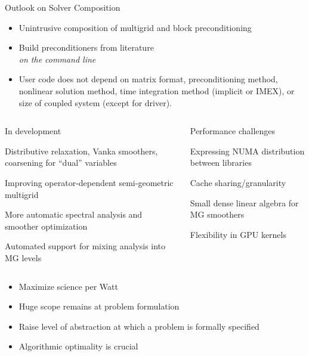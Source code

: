 \documentclass{beamer}
\begin{document}
\begin{frame}{Outlook on Solver Composition}
  \begin{itemize}
  \item Unintrusive composition of multigrid and block preconditioning
  \item Build preconditioners from literature \\
    \emph{on the command line}
  \item User code does not depend on matrix format, preconditioning method, nonlinear solution method, time integration method (implicit or IMEX), or size of coupled system (except for driver).
  \end{itemize}
  \begin{columns}
    \begin{column}{0.5\textwidth}
      \begin{block}{In development}
        \begin{itemize}
          {\small
          \item Distributive relaxation, Vanka smoothers, coarsening for ``dual'' variables
          \item Improving operator-dependent semi-geometric multigrid
          \item More automatic spectral analysis and smoother optimization
          \item Automated support for mixing analysis into MG levels
          }
        \end{itemize}
      \end{block}
    \end{column}
    \begin{column}{0.5\textwidth}
      \begin{block}{Performance challenges}
        \begin{itemize}
          {\small
          \item Expressing NUMA distribution between libraries
          \item Cache sharing/granularity
          \item Small dense linear algebra for MG smoothers
          \item Flexibility in GPU kernels
          }
        \end{itemize}
      \end{block}
    \end{column}
  \end{columns}
\end{frame}

\begin{frame}\LARGE
  \begin{itemize}
  \item Maximize science per Watt
  \item Huge scope remains at problem formulation
  \item Raise level of abstraction at which a problem is formally specified
  \item Algorithmic optimality is crucial
  \end{itemize}
\end{frame}
\end{document}
